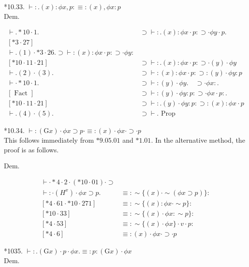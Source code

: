 \documentclass[10pt]{article}
\begin{document}
*10.33. $\vdash: .(x): \phi x, p: \equiv:(x), \phi x: p$\\
Dem.

\[
\begin{array}{ll}
\vdash . * 10 \cdot 1 . & \supset \vdash: .(x): \phi x \cdot p: \supset \cdot \phi y \cdot p . \\
{[* 3 \cdot 27]} & \\
\vdash .(1) \cdot * 3 \cdot 26 . \supset \vdash:(x): \phi x \cdot p: \supset \cdot \phi y: \\
{[* 10 \cdot 11 \cdot 21]} & \supset \vdash: .(x): \phi x \cdot p: \supset \cdot(y) \cdot \phi y \\
\vdash .(2) \cdot(3) . & \supset \vdash:(x): \phi x \cdot p: \supset:(y) \cdot \phi y: p \\
\vdash \cdot * 10 \cdot 1 . & \supset \vdash:(y) \cdot \phi y . \quad \supset \cdot \phi x: . \\
{[\text { Fact }]} & \supset \vdash:(y) \cdot \phi y: p: \supset \cdot \phi x \cdot p: . \\
{[* 10 \cdot 11 \cdot 21]} & \supset \vdash: .(y) \cdot \phi y: p: \supset:(x): \phi x \cdot p  \tag{5}\\
\vdash .(4) \cdot(5) . & \supset \vdash . \text { Prop }
\end{array}
\]

*10.34. $\vdash:(\mathrm{G} x) \cdot \phi x \supset p \cdot \equiv:(x) \cdot \phi x \cdot \supset \cdot p$\\
This follows immediately from $* 9.05 .01$ and $* 1.01$. In the alternative method, the proof is as follows.

Dem.

$$
\begin{array}{ll}
\vdash \cdot * 4 \cdot 2 \cdot(* 10 \cdot 01) \cdot \supset & \\
\vdash: \cdot\left(H^{x}\right) \cdot \phi x \supset p . & \equiv: \sim\{(x) \cdot \sim(\phi x \supset p)\}: \\
{[* 4 \cdot 61 \cdot * 10 \cdot 271]} & \equiv: \sim\{(x): \phi x \cdot \sim p\}: \\
{[* 10 \cdot 33]} & \equiv: \sim\{(x) \cdot \phi x: \sim p\}: \\
{[* 4 \cdot 53]} & \equiv: \sim\{(x) \cdot \phi x\} \cdot v \cdot p: \\
{[* 4 \cdot 6]} & \equiv:(x) \cdot \phi x \cdot \supset \cdot p
\end{array}
$$

*1035. $\vdash: .(\mathrm{G} x) \cdot p \cdot \phi x . \equiv: p:(\mathrm{G} x) \cdot \phi x$\\
Dem.
\end{document}
